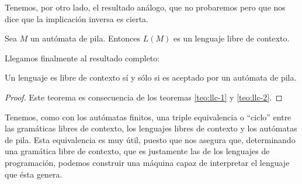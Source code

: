 Tenemos, por otro lado, el resultado análogo, que no probaremos pero que nos dice que la implicación inversa es cierta.

\begin{teorema}\label{teo:llc-2}Sea $M$ un autómata de pila. Entonces $L(M)$ es un lenguaje libre de contexto.
\end{teorema}

Llegamos finalmente al resultado completo:

\begin{teorema}Un lenguaje es libre de contexto sí y sólo si es aceptado por un autómata de pila.
\end{teorema}
\begin{proof}
Este teorema es consecuencia de los teoremas \ref{teo:llc-1} y \ref{teo:llc-2}.
\end{proof}

Tenemos, como con los autómatas finitos, una triple equivalencia o ``ciclo'' entre las gramáticas libres de contexto, los
lenguajes libres de contexto y los autómatas de pila. Esta equivalencia es muy útil, puesto que nos asegura que, 
determinando una gramática libre de contexto, que es justamente las de los lenguajes de programación, podemos construir
una máquina capaz de interpretar el lenguaje que ésta genera.

\endinput
